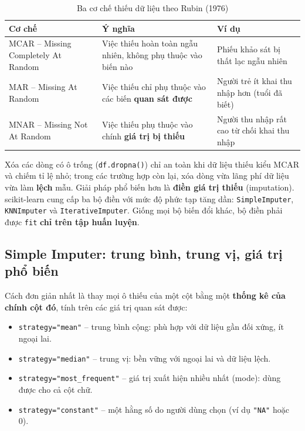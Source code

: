 \begin{table}[H]
\centering
\begin{tabular}{|p{3.6cm}|p{5.4cm}|p{4.4cm}|}
\hline
\textbf{Cơ chế} & \textbf{Ý nghĩa} & \textbf{Ví dụ} \\
\hline
MCAR -- Missing Completely At Random & Việc thiếu hoàn toàn ngẫu nhiên, không phụ thuộc vào biến nào & Phiếu khảo sát bị thất lạc ngẫu nhiên \\ \hline
MAR -- Missing At Random & Việc thiếu chỉ phụ thuộc vào các biến \textbf{quan sát được} & Người trẻ ít khai thu nhập hơn (tuổi đã biết) \\ \hline
MNAR -- Missing Not At Random & Việc thiếu phụ thuộc vào chính \textbf{giá trị bị thiếu} & Người thu nhập rất cao từ chối khai thu nhập \\ \hline
\end{tabular}
\caption{Ba cơ chế thiếu dữ liệu theo Rubin (1976)}
\label{tab:missing-mech}
\end{table}

Xóa các dòng có ô trống (\texttt{df.dropna()}) chỉ an toàn khi dữ liệu thiếu kiểu MCAR và chiếm tỉ lệ nhỏ; trong các trường hợp còn lại, xóa dòng vừa lãng phí dữ liệu vừa làm \textbf{lệch} mẫu. Giải pháp phổ biến hơn là \textbf{điền giá trị thiếu} (imputation). scikit-learn cung cấp ba bộ điền với mức độ phức tạp tăng dần: \texttt{SimpleImputer}, \texttt{KNNImputer} và \texttt{IterativeImputer}. Giống mọi bộ biến đổi khác, bộ điền phải được \texttt{fit} \textbf{chỉ trên tập huấn luyện}.

\subsection{Simple Imputer: trung bình, trung vị, giá trị phổ biến}

Cách đơn giản nhất là thay mọi ô thiếu của một cột bằng một \textbf{thống kê của chính cột đó}, tính trên các giá trị quan sát được:
\begin{itemize}
    \item \texttt{strategy="mean"} -- trung bình cộng: phù hợp với dữ liệu gần đối xứng, ít ngoại lai.
    \item \texttt{strategy="median"} -- trung vị: bền vững với ngoại lai và dữ liệu lệch.
    \item \texttt{strategy="most\_frequent"} -- giá trị xuất hiện nhiều nhất (mode): dùng được cho cả cột chữ.
    \item \texttt{strategy="constant"} -- một hằng số do người dùng chọn (ví dụ \texttt{"NA"} hoặc 0).
\end{itemize}

